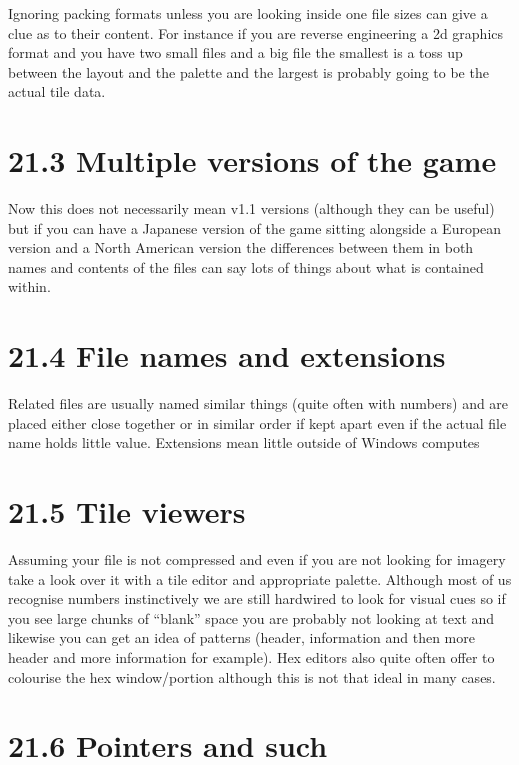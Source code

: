 \documentclass[
]{book}
\begin{document}
Ignoring packing formats unless you are looking inside one file sizes can give a clue as to their content. For instance if you are reverse engineering a 2d graphics format and you have two small files and a big file the smallest is a toss up between the layout and the palette and the largest is probably going to be the actual tile data.

\hypertarget{multiple-versions-of-the-game}{%
\section{21.3 Multiple versions of the game}\label{multiple-versions-of-the-game}}

Now this does not necessarily mean v1.1 versions (although they can be useful) but if you can have a Japanese version of the game sitting alongside a European version and a North American version the differences between them in both names and contents of the files can say lots of things about what is contained within.

\hypertarget{file-names-and-extensions}{%
\section{21.4 File names and extensions}\label{file-names-and-extensions}}

Related files are usually named similar things (quite often with numbers) and are placed either close together or in similar order if kept apart even if the actual file name holds little value. Extensions mean little outside of Windows computes

\hypertarget{tile-viewers}{%
\section{21.5 Tile viewers}\label{tile-viewers}}

Assuming your file is not compressed and even if you are not looking for imagery take a look over it with a tile editor and appropriate palette. Although most of us recognise numbers instinctively we are still hardwired to look for visual cues so if you see large chunks of ``blank'' space you are probably not looking at text and likewise you can get an idea of patterns (header, information and then more header and more information for example). Hex editors also quite often offer to colourise the hex window/portion although this is not that ideal in many cases.

\hypertarget{pointers-and-such}{%
\section{21.6 Pointers and such}\label{pointers-and-such}}
\end{document}
